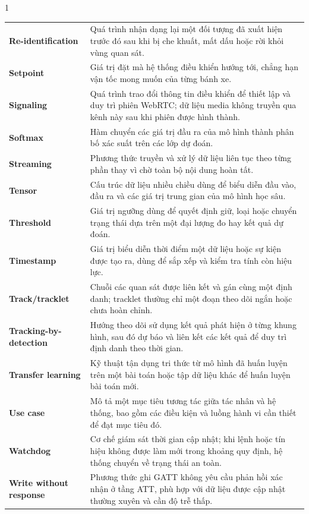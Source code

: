 \begin{spacing}{1}
\begin{longtable}{@{}>{\bfseries\color{HCMUTDarkBlue}}p{4.1cm}p{10.7cm}@{}}
  Re-identification
    & Quá trình nhận dạng lại một đối tượng đã xuất hiện trước đó sau khi bị che khuất, mất dấu hoặc rời khỏi vùng quan sát. \\
  Setpoint
    & Giá trị đặt mà hệ thống điều khiển hướng tới, chẳng hạn vận tốc mong muốn của từng bánh xe. \\
  Signaling
    & Quá trình trao đổi thông tin điều khiển để thiết lập và duy trì phiên WebRTC; dữ liệu media không truyền qua kênh này sau khi phiên được hình thành. \\
  Softmax
    & Hàm chuyển các giá trị đầu ra của mô hình thành phân bố xác suất trên các lớp dự đoán. \\
  Streaming
    & Phương thức truyền và xử lý dữ liệu liên tục theo từng phần thay vì chờ toàn bộ nội dung hoàn tất. \\
  Tensor
    & Cấu trúc dữ liệu nhiều chiều dùng để biểu diễn đầu vào, đầu ra và các giá trị trung gian của mô hình học sâu. \\
  Threshold
    & Giá trị ngưỡng dùng để quyết định giữ, loại hoặc chuyển trạng thái dựa trên một đại lượng đo hay kết quả dự đoán. \\
  Timestamp
    & Giá trị biểu diễn thời điểm một dữ liệu hoặc sự kiện được tạo ra, dùng để sắp xếp và kiểm tra tính còn hiệu lực. \\
  Track/tracklet
    & Chuỗi các quan sát được liên kết và gán cùng một định danh; tracklet thường chỉ một đoạn theo dõi ngắn hoặc chưa hoàn chỉnh. \\
  Tracking-by-detection
    & Hướng theo dõi sử dụng kết quả phát hiện ở từng khung hình, sau đó dự báo và liên kết các kết quả để duy trì định danh theo thời gian. \\
  Transfer learning
    & Kỹ thuật tận dụng tri thức từ mô hình đã huấn luyện trên một bài toán hoặc tập dữ liệu khác để huấn luyện bài toán mới. \\
  Use case
    & Mô tả một mục tiêu tương tác giữa tác nhân và hệ thống, bao gồm các điều kiện và luồng hành vi cần thiết để đạt mục tiêu đó. \\
  Watchdog
    & Cơ chế giám sát thời gian cập nhật; khi lệnh hoặc tín hiệu không được làm mới trong khoảng quy định, hệ thống chuyển về trạng thái an toàn. \\
  Write without response
    & Phương thức ghi GATT không yêu cầu phản hồi xác nhận ở tầng ATT, phù hợp với dữ liệu được cập nhật thường xuyên và cần độ trễ thấp. \\
\end{longtable}
\end{spacing}
